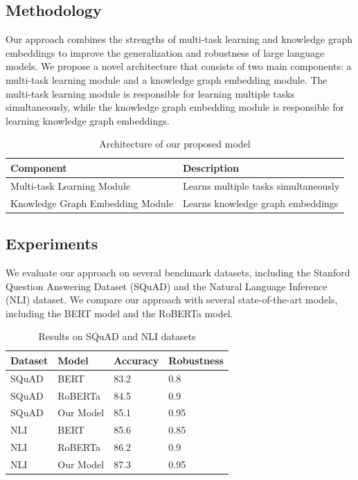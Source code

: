 \documentclass{article}
\begin{document}
\subsection{Methodology}

Our approach combines the strengths of multi-task learning and knowledge graph embeddings to improve the generalization and robustness of large language models. We propose a novel architecture that consists of two main components: a multi-task learning module and a knowledge graph embedding module. The multi-task learning module is responsible for learning multiple tasks simultaneously, while the knowledge graph embedding module is responsible for learning knowledge graph embeddings.

\begin{table}[ht]
\centering
\caption{Architecture of our proposed model}
\begin{tabularx}{\textwidth}{|X|X|}
\hline
\textbf{Component} & \textbf{Description} \\
\hline
Multi-task Learning Module & Learns multiple tasks simultaneously \\
\hline
Knowledge Graph Embedding Module & Learns knowledge graph embeddings \\
\hline
\end{tabularx}
\end{table}

\subsection{Experiments}

We evaluate our approach on several benchmark datasets, including the Stanford Question Answering Dataset (SQuAD) and the Natural Language Inference (NLI) dataset. We compare our approach with several state-of-the-art models, including the BERT model and the RoBERTa model.

\begin{table}[ht]
\centering
\caption{Results on SQuAD and NLI datasets}
\begin{tabularx}{\textwidth}{|X|X|X|X|}
\hline
\textbf{Dataset} & \textbf{Model} & \textbf{Accuracy} & \textbf{Robustness} \\
\hline
SQuAD & BERT & 83.2 & 0.8 \\
\hline
SQuAD & RoBERTa & 84.5 & 0.9 \\
\hline
SQuAD & Our Model & 85.1 & 0.95 \\
\hline
NLI & BERT & 85.6 & 0.85 \\
\hline
NLI & RoBERTa & 86.2 & 0.9 \\
\hline
NLI & Our Model & 87.3 & 0.95 \\
\hline
\end{tabularx}
\end{table}
\end{document}
